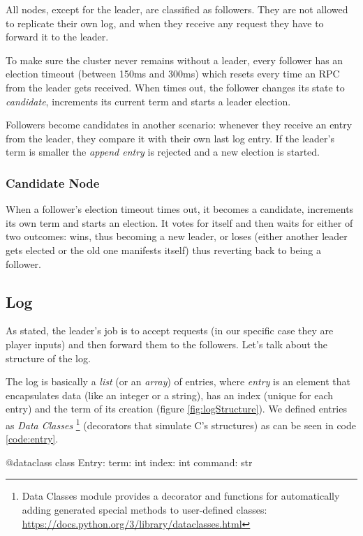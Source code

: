 All nodes, except for the leader, are classified as followers. They are not allowed to replicate their own log, and when they receive any request they have to forward it to the leader.

To make sure the cluster never remains without a leader, every follower has an election timeout (between 150ms and 300ms) which resets every time an RPC from the leader gets received. When times out, the follower changes its state to \textit{candidate}, increments its current term and starts a leader election. 

Followers become candidates in another scenario: whenever they receive an entry from the leader, they compare it with their own last log entry. If the leader's term is smaller the \textit{append entry} is rejected and a new election is started. 

\subsubsection{Candidate Node}

When a follower's election timeout times out, it becomes a candidate, increments its own term and starts an election. It votes for itself and then waits for either of two outcomes: wins, thus becoming a new leader, or loses (either another leader gets elected or the old one manifests itself) thus reverting back to being a follower.

\subsection{Log}

As stated, the leader's job is to accept requests (in our specific case they are player inputs) and then forward them to the followers. Let's talk about the structure of the log. 

The log is basically a \textit{list} (or an \textit{array}) of entries, where \textit{entry} is an element that encapsulates data (like an integer or a string), has an index (unique for each entry) and the term of its creation (figure \ref{fig:logStructure}). We defined entries as \textit{Data Classes} \footnote{Data Classes module provides a decorator and functions for automatically adding generated special methods to user-defined classes: \url{https://docs.python.org/3/library/dataclasses.html}} (decorators that simulate C's structures) as can be seen in code \ref{code:entry}.

\begin{python}[label={code:entry}, caption={Dataclass Entry definition}]
@dataclass
class Entry:
    term: int
    index: int
    command: str 
\end{python}

